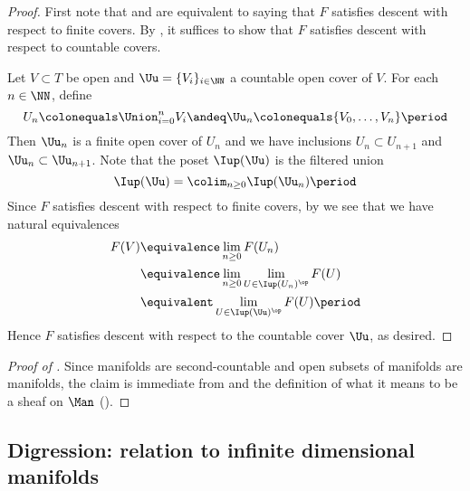 \begin{proof}
	First note that  and  are equivalent to saying that $ F $ satisfies descent with respect to finite covers.
	By , it suffices to show that $ F $ satisfies descent with respect to countable covers.

	Let $ V \subset T $ be open and $ \Uu = \{V_i\}_{i \in \NN} $ a countable open cover of $ V $.
	For each $ n \in \NN $, define
	\begin{equation*}
		U_n \colonequals \Union_{i=0}^{n} V_i \andeq \Uu_n \colonequals \{V_0,\ldots,V_n\} \period
	\end{equation*}
	Then $ \Uu_n $ is a finite open cover of $ U_n $ and we have inclusions $ U_n \subset U_{n+1} $ and $ \Uu_n \subset \Uu_{n+1} $.
	Note that the poset $ \Iup(\Uu) $ is the filtered union
	\begin{equation*}
		\Iup(\Uu) = \colim_{n \geq 0} \Iup(\Uu_n) \period
	\end{equation*}
	Since $ F $ satisfies descent with respect to finite covers, by  we see that we have natural equivalences
	\begin{align*}
		F(V) &\equivalence \lim_{n \geq 0} F(U_n) \\ 
		&\equivalence \lim_{n \geq 0} \lim_{U \in \Iup(U_n)^{\op}} F(U) \\ 
		&\equivalent \lim_{U \in \Iup(\Uu)^{\op}} F(U) \period
	\end{align*}
	Hence $ F $ satisfies descent with respect to the countable cover $ \Uu $, as desired.
\end{proof}

\begin{proof}[Proof of ]
	Since manifolds are second-countable and open subsets of manifolds are manifolds, the claim is immediate from  and the definition of what it means to be a sheaf on $ \Man $ ().
\end{proof}


\subsection{Digression: relation to infinite dimensional manifolds}\label{subsec:infdimMan}

